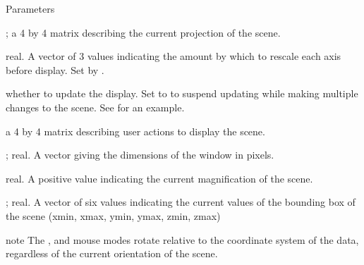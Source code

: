 \begin{Section}{Parameters}
{\item[\code{projMatrix}] \emph{}; a 4 by 4 matrix describing the current
projection of the scene.
\item[\code{scale}] real.  A vector of 3 values indicating the amount by which to
rescale each axis before display.  Set by .
\item[\code{skipRedraw}] whether to update the display.  Set to  to suspend
updating while making multiple changes to the scene.  See  for an example.
\item[\code{userMatrix}] a 4 by 4 matrix describing user actions to
display the scene.
\item[\code{viewport}] \emph{}; real.  A vector giving the dimensions of the
window in pixels.
\item[\code{zoom}] real. A positive value indicating the current
magnification of the scene.
\item[\code{bbox}] \emph{}; real. A vector of six values indicating the current values of the
bounding box of the scene (xmin, xmax, ymin, ymax, zmin, zmax)
}
\end{Section}
\begin{Section}{note}
The ,  and  mouse modes rotate relative to the coordinate
system of the data, regardless of the current orientation of the scene.
\end{Section}
